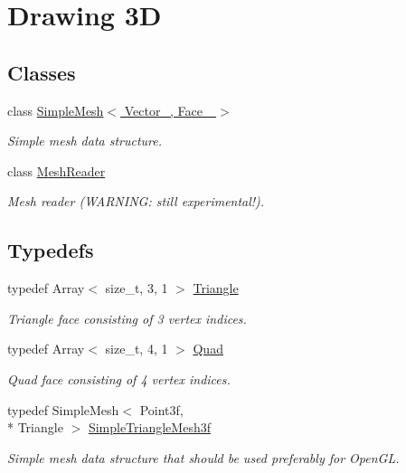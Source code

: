 \hypertarget{group___draw3_d}{\section{Drawing 3\-D}
\label{group___draw3_d}
}
\subsection*{Classes}
\begin{DoxyCompactItemize}
\item 
class \hyperlink{class_d_o_1_1_simple_mesh}{Simple\-Mesh$<$ Vector\-\_\-, Face\-\_\- $>$}
\begin{DoxyCompactList}\small\item\em Simple mesh data structure. \end{DoxyCompactList}\item 
class \hyperlink{class_d_o_1_1_mesh_reader}{Mesh\-Reader}
\begin{DoxyCompactList}\small\item\em Mesh reader (W\-A\-R\-N\-I\-N\-G\-: still experimental!). \end{DoxyCompactList}\end{DoxyCompactItemize}
\subsection*{Typedefs}
\begin{DoxyCompactItemize}
\item 
\hypertarget{group___draw3_d_ga0ca67ac512a882951211499a31ab60a0}{typedef Array$<$ size\-\_\-t, 3, 1 $>$ \hyperlink{group___draw3_d_ga0ca67ac512a882951211499a31ab60a0}{Triangle}}\label{group___draw3_d_ga0ca67ac512a882951211499a31ab60a0}

\begin{DoxyCompactList}\small\item\em Triangle face consisting of 3 vertex indices. \end{DoxyCompactList}\item 
\hypertarget{group___draw3_d_gae5a923c17de7c04456eb0c0e9c0537e4}{typedef Array$<$ size\-\_\-t, 4, 1 $>$ \hyperlink{group___draw3_d_gae5a923c17de7c04456eb0c0e9c0537e4}{Quad}}\label{group___draw3_d_gae5a923c17de7c04456eb0c0e9c0537e4}

\begin{DoxyCompactList}\small\item\em Quad face consisting of 4 vertex indices. \end{DoxyCompactList}\item 
\hypertarget{group___draw3_d_ga4f1ab8c8365dc907bff111a6f87e6141}{typedef Simple\-Mesh$<$ Point3f, \\*
Triangle $>$ \hyperlink{group___draw3_d_ga4f1ab8c8365dc907bff111a6f87e6141}{Simple\-Triangle\-Mesh3f}}\label{group___draw3_d_ga4f1ab8c8365dc907bff111a6f87e6141}

\begin{DoxyCompactList}\small\item\em Simple mesh data structure that should be used preferably for Open\-G\-L. \end{DoxyCompactList}\end{DoxyCompactItemize}
